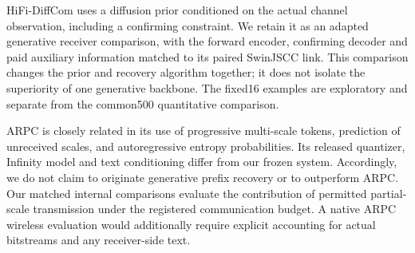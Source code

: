 HiFi-DiffCom uses a diffusion prior conditioned on the actual channel observation,
including a confirming constraint. We retain it as an adapted generative receiver
comparison, with the forward encoder, confirming decoder and paid auxiliary
information matched to its paired SwinJSCC link. This comparison changes the
prior and recovery algorithm together; it does not isolate the superiority of
one generative backbone. The fixed16 examples are exploratory and separate from
the common500 quantitative comparison.

ARPC is closely related in its use of progressive multi-scale tokens, prediction
of unreceived scales, and autoregressive entropy probabilities. Its released
quantizer, Infinity model and text conditioning differ from our frozen system.
Accordingly, we do not claim to originate generative prefix recovery or to
outperform ARPC. Our matched internal comparisons evaluate the contribution of
permitted partial-scale transmission under the registered communication budget.
A native ARPC wireless evaluation would additionally require explicit accounting
for actual bitstreams and any receiver-side text.
